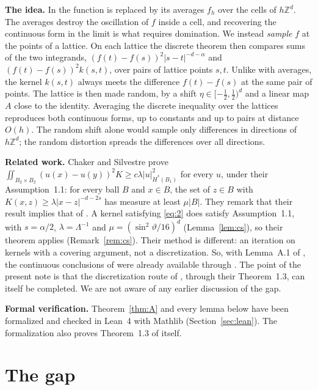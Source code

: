 \documentclass[11pt]{amsart}
\theoremstyle{remark}
\newcommand{\Z}{\mathbb{Z}}
\newcommand{\abs}[1]{\lvert #1\rvert}
\newcommand{\norm}[1]{\lvert #1\rvert}
\newcommand{\1}{\mathbf{1}}
\begin{document}
\medskip\noindent\textbf{The idea.} In \cite{BKS} the function is replaced by its averages
$f_h$ over the cells of $h\Z^d$. The averages destroy the oscillation of $f$ inside a cell, and
recovering the continuous form in the limit is what requires domination. We instead
\emph{sample} $f$ at the points of a lattice. On each lattice the discrete theorem then compares
sums of the two integrands, $(f(t)-f(s))^2\norm{s-t}^{-d-\alpha}$ and $(f(t)-f(s))^2k(s,t)$, over
pairs of lattice points $s,t$. Unlike with averages, the kernel $k(s,t)$ always meets the
difference $f(t)-f(s)$ at the same pair of points. The lattice is then made random, by a shift
$\eta\in[-\tfrac12,\tfrac12)^d$ and a linear map $A$ close to the identity. Averaging the discrete
inequality over the lattices reproduces both continuous forms, up to constants and up to pairs at
distance $O(h)$. The random shift alone would sample only differences in directions of $h\Z^d$;
the random distortion spreads the differences over all directions.

\medskip\noindent\textbf{Related work.} Chaker and Silvestre \cite[Theorem~1.3]{CS} prove
$\iint_{B_2\times B_2}(u(x)-u(y))^2K\ge c\lambda\abs{u}^2_{\dot H^s(B_1)}$ for every $u$, under
their Assumption~1.1: for every ball $B$ and $x\in B$, the set of $z\in B$ with
$K(x,z)\ge\lambda\norm{x-z}^{-d-2s}$ has measure at least $\mu\abs B$. They remark that their
result implies that of \cite{BKS}. A kernel satisfying \eqref{eq:2} does satisfy Assumption~1.1,
with $s=\alpha/2$, $\lambda=\Lambda^{-1}$ and $\mu=(\sin^2\vartheta/16)^d$ (Lemma~\ref{lem:cs}), so
their theorem applies (Remark~\ref{rem:cs}). Their method is different: an iteration on kernels with a covering
argument, not a discretization. So, with Lemma~A.1 of \cite{BKS}, the continuous conclusions of
\cite{BKS} were already available through \cite{CS}. The point of the present note is that the
discretization route of \cite{BKS}, through their Theorem~1.3, can itself be completed. We are
not aware of any earlier discussion of the gap.

\medskip\noindent\textbf{Formal verification.} Theorem~\ref{thm:A} and every lemma below have
been formalized and checked in Lean~4 with Mathlib (Section~\ref{sec:lean}). The formalization
also proves Theorem~1.3 of \cite{BKS} itself.

\section{The gap}\label{sec:gap}
\end{document}

